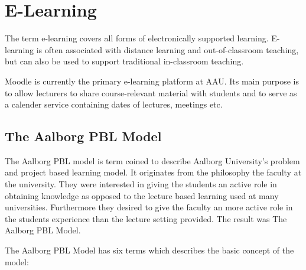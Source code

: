 \section{E-Learning}
The term e-learning covers all forms of electronically supported learning. E-learning is often associated with distance learning and out-of-classroom teaching, but can also be used to support traditional in-classroom teaching.

Moodle is currently the primary e-learning platform at AAU. Its main purpose is to allow lecturers to share course-relevant material with students and to serve as a calender service containing dates of lectures, meetings etc.

\subsection{The Aalborg PBL Model}
The Aalborg PBL model is term coined to describe Aalborg University's problem and project based learning model. It originates from the philosophy the faculty at the university. They were interested in giving the students an active role in obtaining knowledge as opposed to the lecture based learning used at many universities. Furthermore they desired to give the faculty an more active role in the students experience than the lecture setting provided. The result was The Aalborg PBL Model.

The Aalborg PBL Model has six terms which describes the basic concept of the model:

